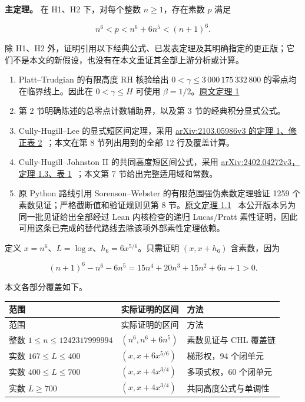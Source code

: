 \documentclass[UTF8,zihao=-4,fontset=fandol]{ctexart}
\begin{document}
\textbf{主定理。} 在 H1、H2 下，对每个整数 \(n\ge1\)，存在素数 \(p\) 满足

\[
n^6<p<n^6+6n^5<(n+1)^6. \tag{2}
\]

除 H1、H2 外，证明引用以下经典公式、已发表定理及其明确指定的更正版；它们不是本文的新假设，也没有在本文重证其全部上游分析或计算。

\begin{enumerate}
\item Platt–Trudgian 的有限高度 RH 核验给出 \(0<\gamma\le3\,000\,175\,332\,800\) 的零点均在临界线上。因此在 \(0<\gamma\le H\) 可使用 \(\beta=1/2\)。\href{https://arxiv.org/abs/2004.09765}{原文定理 1}~\cite{PT}
\item 第 2 节明确陈述的总零点计数辅助界，以及第 3 节的经典积分显式公式。
\item Cully-Hugill–Lee 的显式短区间定理，采用 \href{https://arxiv.org/html/2103.05986v3}{arXiv:2103.05986v3 的定理 1、修正表 2}~\cite{CHL}；本文在第 8 节列出用到的全部 12 行及覆盖计算。
\item Cully-Hugill–Johnston II 的共同高度短区间公式，采用 \href{https://arxiv.org/html/2402.04272v3}{arXiv:2402.04272v3，定理 1.3、表 1}~\cite{CHJ}；本文第 7 节给出完整适用域和常数。
\item 原 Python 路线引用 Sorenson–Webster 的有限范围强伪素数定理验证 1259 个素数见证；严格截断值和验证规则见第 8 节。\href{https://arxiv.org/abs/1509.00864}{原文定理 1.1}~\cite{SW} 本公开版本另为同一批见证给出全部经过 Lean 内核检查的递归 Lucas/Pratt 素性证明，因此可用这条已完成的替代路线去除该项外部素性定理依赖。
\end{enumerate}

定义 \(x=n^6\)、\(L=\log x\)、\(h_6=6x^{5/6}\)。只需证明 \((x,x+h_6)\) 含素数，因为

\[
(n+1)^6-n^6-6n^5
=15n^4+20n^3+15n^2+6n+1>0. \tag{3}
\]

本文各部分覆盖如下。

\begingroup\small\setlength{\tabcolsep}{3pt}
\begin{longtable}{>{\raggedright\arraybackslash}p{}>{\raggedright\arraybackslash}p{}>{\raggedright\arraybackslash}p{}}
\toprule
范围 & 实际证明的区间 & 方法 \\
\midrule\endfirsthead
\toprule
范围 & 实际证明的区间 & 方法 \\
\midrule\endhead
\bottomrule\endfoot
整数 \(1\le n\le1242317999994\) & \((n^6,n^6+6n^5)\) & 素数见证与 CHL 覆盖链 \\
实数 \(167\le L\le400\) & \((x,x+6x^{5/6})\) & 梯形权，94 个闭单元 \\
实数 \(400\le L\le700\) & \((x,x+4x^{3/4})\) & 多项式权，60 个闭单元 \\
实数 \(L\ge700\) & \((x,x+4x^{3/4})\) & 共同高度公式与单调性 \\
\end{longtable}
\endgroup
\end{document}
